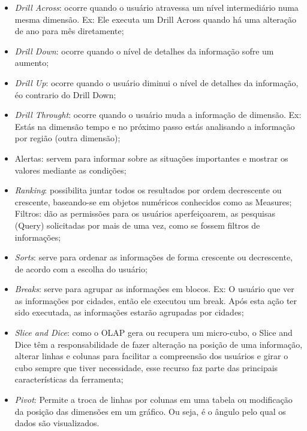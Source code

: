 \begin{itemize}

    \item \textit{Drill Across}: ocorre quando o usu\'{a}rio atravessa um n\'{i}vel intermedi\'{a}rio numa mesma dimens\~{a}o. Ex: Ele executa um Drill Across quando h\'{a} uma altera\c{c}\~{a}o de ano para mês diretamente;

    \item \textit{Drill Down}: ocorre quando o n\'{i}vel de detalhes da informa\c{c}\~{a}o sofre um aumento;
    
    \item \textit{Drill Up}: ocorre quando o usu\'{a}rio diminui o n\'{i}vel de detalhes da informa\c{c}\~{a}o, \'{e}o contrario do Drill Down;
    
    \item \textit{Drill Throught}: ocorre quando o usu\'{a}rio muda a informa\c{c}\~{a}o de dimens\~{a}o. Ex: Est\'{a}s na dimens\~{a}o tempo e no pr\'{o}ximo passo est\'{a}s analisando a informa\c{c}\~{a}o por regi\~{a}o (outra dimens\~{a}o);
    
    \item Alertas: servem para informar sobre as situa\c{c}\~{o}es importantes e mostrar os valores mediante as condi\c{c}\~{o}es;
    
    \item \textit{Ranking}: possibilita juntar todos os resultados por ordem decrescente ou crescente, baseando-se em objetos num\'{e}ricos conhecidos como as Measures;
    Filtros: d\~{a}o as permiss\~{o}es para os usu\'{a}rios aperfei\c{c}oarem, as pesquisas (Query) solicitadas por mais de uma vez, como se fossem filtros de informa\c{c}\~{o}es;
    
    \item \textit{Sorts}: serve para ordenar as informa\c{c}\~{o}es de forma crescente ou decrescente, de acordo com a escolha do usu\'{a}rio;
    
    \item \textit{Breaks}: serve para agrupar as informa\c{c}\~{o}es em blocos. Ex: O usu\'{a}rio que ver as informa\c{c}\~{o}es por cidades, ent\~{a}o ele executou um break. Ap\'{o}s esta a\c{c}\~{a}o ter sido executada, as informa\c{c}\~{o}es estar\~{a}o agrupadas por cidades;
    
    \item \textit{Slice and Dice}: como o OLAP gera ou recupera um micro-cubo, o Slice and Dice têm a responsabilidade de fazer altera\c{c}\~{a}o na posi\c{c}\~{a}o de uma informa\c{c}\~{a}o, alterar linhas e colunas para facilitar a compreens\~{a}o dos usu\'{a}rios e girar o cubo sempre que tiver necessidade, esse recurso faz parte das principais caracter\'{i}sticas da ferramenta;
    
    \item \textit{Pivot}: Permite a troca de linhas por colunas em uma tabela ou modifica\c{c}\~{a}o da posi\c{c}\~{a}o das dimens\~{o}es em um gr\'{a}fico. Ou seja, \'{e} o ângulo pelo qual os dados s\~{a}o visualizados.
    
\end{itemize}

